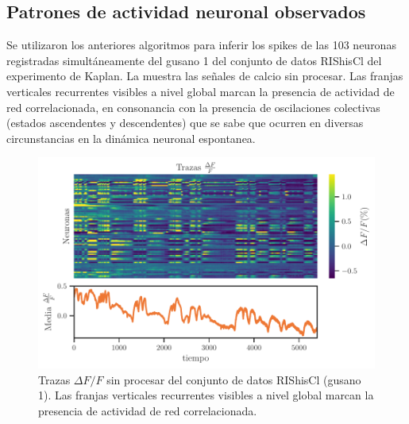   
\subsection{Patrones de actividad neuronal observados}


Se utilizaron los anteriores algoritmos   para inferir los spikes de las 103 neuronas registradas simultáneamente del gusano 1 del conjunto de datos RIShisCl del experimento de Kaplan.  La  muestra las señales de calcio  sin procesar. Las franjas verticales recurrentes visibles a nivel global  marcan la presencia de actividad de red correlacionada, en consonancia con la presencia de oscilaciones colectivas  (estados ascendentes y descendentes) que se sabe que ocurren en diversas circunstancias en la dinámica neuronal espontanea. 


    \begin{figure}[h!]
	\centering{}\includegraphics[width=\imsize]{cascade_1.pdf}
	\caption[Trazas $\Delta F/F$ sin procesar  del conjunto de datos RIShisCl  (gusano 1).]{Trazas $\Delta F/F$ sin procesar  del conjunto de datos RIShisCl  (gusano 1).  Las franjas verticales recurrentes visibles a nivel global  marcan la presencia de actividad de red correlacionada.}\label{f:cascade_1}  
\end{figure}



